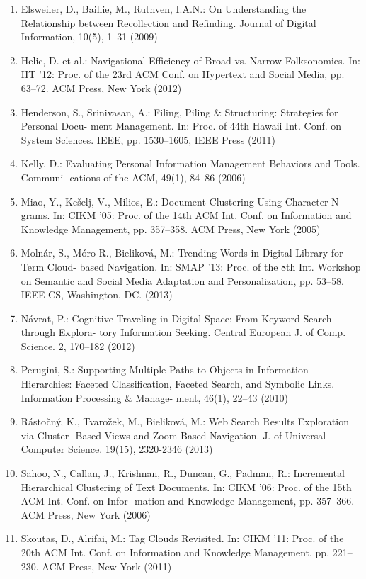 \documentclass{llncs}
\begin{document}
\begin{enumerate}
\item Elsweiler, D., Baillie, M., Ruthven, I.A.N.: On Understanding the Relationship between Recollection and Refinding. Journal of Digital Information, 10(5), 1–31 (2009)
\item Helic, D. et al.: Navigational Efficiency of Broad vs. Narrow Folksonomies. In: HT '12: Proc. of the 23rd ACM Conf. on Hypertext and Social Media, pp. 63–72. ACM Press, New York (2012)
\item Henderson, S., Srinivasan, A.: Filing, Piling \& Structuring: Strategies for Personal Docu- ment Management. In: Proc. of 44th Hawaii Int. Conf. on System Sciences. IEEE, pp. 1530–1605, IEEE Press (2011)
\item Kelly, D.: Evaluating Personal Information Management Behaviors and Tools. Communi- cations of the ACM, 49(1), 84–86 (2006)
\item Miao, Y., Kešelj, V., Milios, E.: Document Clustering Using Character N-grams. In: CIKM '05: Proc. of the 14th ACM Int. Conf. on Information and Knowledge Management, pp. 357–358. ACM Press, New York (2005)
\item Molnár, S., Móro R., Bieliková, M.: Trending Words in Digital Library for Term Cloud- based Navigation. In: SMAP '13: Proc. of the 8th Int. Workshop on Semantic and Social Media Adaptation and Personalization, pp. 53–58. IEEE CS, Washington, DC. (2013)
\item Návrat, P.: Cognitive Traveling in Digital Space: From Keyword Search through Explora- tory Information Seeking. Central European J. of Comp. Science. 2, 170–182 (2012)
\item Perugini, S.: Supporting Multiple Paths to Objects in Information Hierarchies: Faceted Classification, Faceted Search, and Symbolic Links. Information Processing \& Manage- ment, 46(1), 22–43 (2010)
\item Rástočný, K., Tvarožek, M., Bieliková, M.: Web Search Results Exploration via Cluster- Based Views and Zoom-Based Navigation. J. of Universal Computer Science. 19(15), 2320-2346 (2013)
\item Sahoo, N., Callan, J., Krishnan, R., Duncan, G., Padman, R.: Incremental Hierarchical Clustering of Text Documents. In: CIKM '06: Proc. of the 15th ACM Int. Conf. on Infor- mation and Knowledge Management, pp. 357–366. ACM Press, New York (2006)
\item Skoutas, D., Alrifai, M.: Tag Clouds Revisited. In: CIKM '11: Proc. of the 20th ACM Int. Conf. on Information and Knowledge Management, pp. 221–230. ACM Press, New York (2011)

\end{enumerate}
\end{document}

